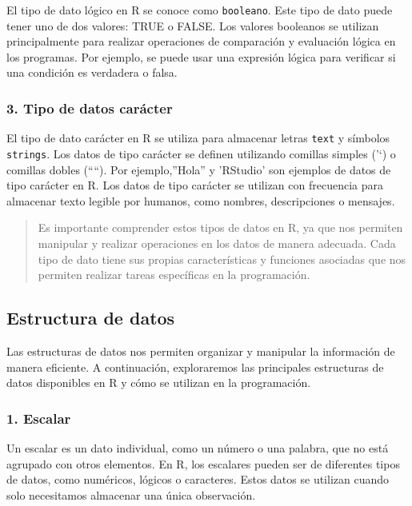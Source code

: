 \documentclass[
  a4paper,
]{article}
\begin{document}
El tipo de dato lógico en R se conoce como \texttt{booleano}. Este tipo
de dato puede tener uno de dos valores: TRUE o FALSE. Los valores
booleanos se utilizan principalmente para realizar operaciones de
comparación y evaluación lógica en los programas. Por ejemplo, se puede
usar una expresión lógica para verificar si una condición es verdadera o
falsa.

\hypertarget{tipo-de-datos-caruxe1cter}{%
\subsubsection{3. Tipo de datos
carácter}\label{tipo-de-datos-caruxe1cter}}

El tipo de dato carácter en R se utiliza para almacenar letras
\texttt{text} y símbolos \texttt{strings}. Los datos de tipo carácter se
definen utilizando comillas simples ('`) o comillas dobles (````). Por
ejemplo,''Hola'' y 'RStudio' son ejemplos de datos de tipo carácter en
R. Los datos de tipo carácter se utilizan con frecuencia para almacenar
texto legible por humanos, como nombres, descripciones o mensajes.

\begin{quote}
Es importante comprender estos tipos de datos en R, ya que nos permiten
manipular y realizar operaciones en los datos de manera adecuada. Cada
tipo de dato tiene sus propias características y funciones asociadas que
nos permiten realizar tareas específicas en la programación.
\end{quote}

\hypertarget{estructura-de-datos}{%
\subsection{Estructura de datos}\label{estructura-de-datos}}

Las estructuras de datos nos permiten organizar y manipular la
información de manera eficiente. A continuación, exploraremos las
principales estructuras de datos disponibles en R y cómo se utilizan en
la programación.

\hypertarget{escalar}{%
\subsubsection{1. Escalar}\label{escalar}}

Un escalar es un dato individual, como un número o una palabra, que no
está agrupado con otros elementos. En R, los escalares pueden ser de
diferentes tipos de datos, como numéricos, lógicos o caracteres. Estos
datos se utilizan cuando solo necesitamos almacenar una única
observación.
\end{document}
